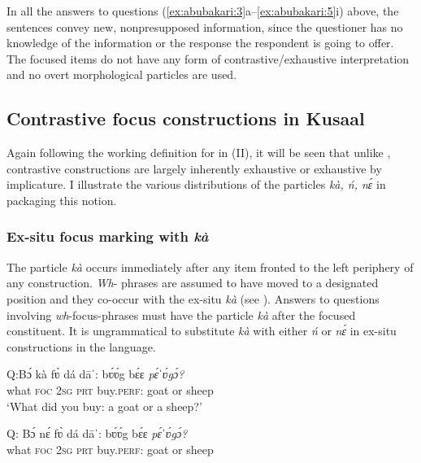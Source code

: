 \documentclass[output=paper,modfonts,nonflat,
\ChapterDOI{10.5281/zenodo.3367154}
 hidelinks
]{langsci/langscibook}
\begin{document}
In all the answers to questions (\ref{ex:abubakari:3}a--\ref{ex:abubakari:5}i) above, the sentences convey new, nonpresupposed information, since the questioner has no knowledge of the information or the response the respondent is going to offer. The focused items do not have any form of contrastive{\slash}exhaustive interpretation and no overt morphological  particles are used. 

\subsection{Contrastive focus constructions in {Kusaal}}\label{sec:abubakari:2.2}

Again following the working definition for  in (II), it will be seen that unlike , contrastive  constructions are largely inherently exhaustive or exhaustive by implicature. I illustrate the various distributions of the particles \textit{kà, ń, nɛ́} in packaging this notion.

\subsubsection{Ex-situ focus marking with \textit{kà}}

The particle \textit{kà} occurs immediately after any item fronted to the left periphery of any construction. \textit{Wh}{}- phrases are assumed to have moved to a designated  position and they co-occur with the ex-situ  \textit{kà} (see \citealt{aboh2007}). Answers to questions involving \textit{wh}{}-focus-phrases must have the particle \textit{kà} after the focused constituent. It is ungrammatical to substitute \textit{kà} with either \textit{ń} or \textit{nɛ́} in ex-situ  constructions in the language. 

 
\ea\label{ex:abubakari:6}
\ea \label{ex:abubakari:6a} 
Q:\gll Bɔ́  kà  fʋ̀  dá  dāˈ:    bʋ́ʋ́g  bɛ́ɛ  \textit{pɛ́ˈʋ́gɔ́?}\\  
what  \textsc{foc}  2\textsc{sg}  \textsc{prt}  buy.\textsc{perf}:  goat  or 
sheep          \\
\glt ‘What did you buy: a goat or a sheep?’ 

\ex \label{ex:abubakari:6b} 
Q: \gll *Bɔ́  nɛ́  fʋ̀  dá  dāˈ:    bʋ́ʋ́g  bɛ́ɛ \textit{pɛ́ˈʋ́gɔ́?}\\
 what  \textsc{foc}  2\textsc{sg}  \textsc{prt}  buy.\textsc{perf}:  goat  or  sheep\\
  
\end{document}
